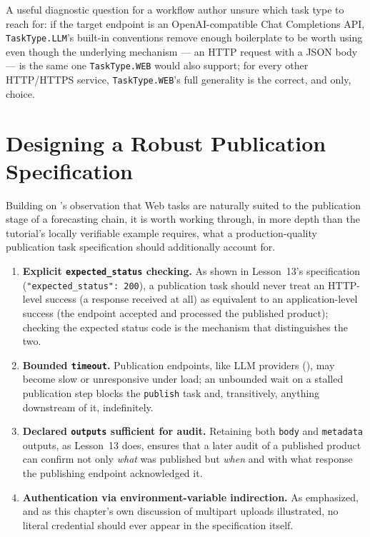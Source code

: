 \begin{practicebox}
A useful diagnostic question for a workflow author unsure which task type to
reach for: if the target endpoint is an OpenAI-compatible Chat Completions
API, \texttt{TaskType.LLM}'s built-in conventions remove enough boilerplate
to be worth using even though the underlying mechanism --- an HTTP request
with a JSON body --- is the same one \texttt{TaskType.WEB} would also
support; for every other HTTP/HTTPS service, \texttt{TaskType.WEB}'s full
generality is the correct, and only, choice.
\end{practicebox}

\section{Designing a Robust Publication Specification}

Building on 's observation that Web tasks are naturally
suited to the publication stage of a forecasting chain, it is worth working
through, in more depth than the tutorial's locally verifiable example
requires, what a production-quality publication task specification should
additionally account for.

\begin{enumerate}[leftmargin=1.8em]
  \item \textbf{Explicit \texttt{expected\_status} checking.} As shown in
    Lesson~13's specification (\texttt{"expected\_status": 200}), a
    publication task should never treat an HTTP-level success (a response
    received at all) as equivalent to an application-level success (the
    endpoint accepted and processed the published product); checking the
    expected status code is the mechanism that distinguishes the two.
  \item \textbf{Bounded \texttt{timeout}.} Publication endpoints, like LLM
    providers (), may become slow or unresponsive under
    load; an unbounded wait on a stalled publication step blocks the
    \texttt{publish} task and, transitively, anything downstream of it,
    indefinitely.
  \item \textbf{Declared \texttt{outputs} sufficient for audit.} Retaining
    both \texttt{body} and \texttt{metadata} outputs, as Lesson~13 does,
    ensures that a later audit of a published product can confirm not only
    \emph{what} was published but \emph{when} and with what response the
    publishing endpoint acknowledged it.
  \item \textbf{Authentication via environment-variable indirection.} As
     emphasized, and as this chapter's own
    discussion of multipart uploads illustrated, no literal credential
    should ever appear in the specification itself.
\end{enumerate}


